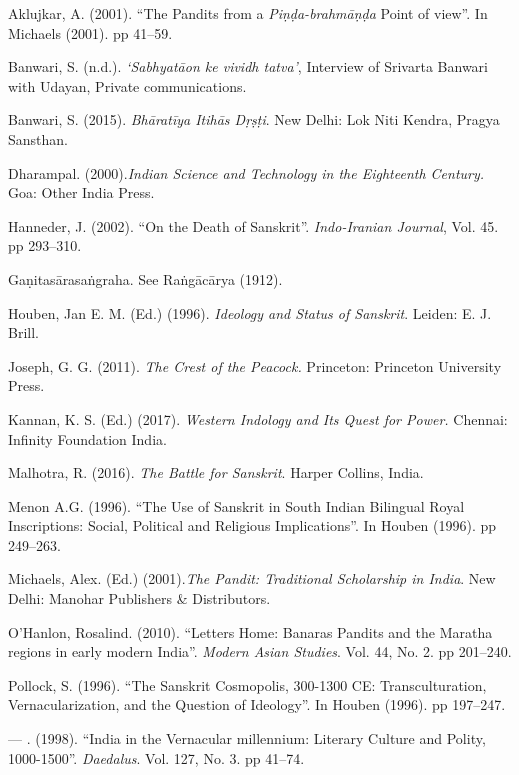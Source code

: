 \begin{thebibliography}{99}
\itemsep=1pt
 Aklujkar, A. (2001). “The Pandits from a \textit{Piṇḍa-brahmāṇḍa} Point of view”. In Michaels (2001). pp 41--59.

  Banwari, S. (n.d.). \textit{‘Sabhyatāon ke vividh tatva’}, Interview of Srivarta Banwari with Udayan, Private communications.

  Banwari, S. (2015). \textit{Bhāratīya Itihās Dṛṣṭi}. New Delhi: Lok Niti Kendra, Pragya Sansthan.

  Dharampal. (2000).\textit{Indian Science and Technology in the Eighteenth Century.} Goa: Other India Press.

  Hanneder, J. (2002). “On the Death of Sanskrit”. \textit{Indo-Iranian Journal}, Vol. 45. pp 293--310.
 
  Gaṇitasārasaṅgraha. See Raṅgācārya (1912).

  Houben, Jan E. M. (Ed.) (1996). \textit{Ideology and Status of Sanskrit}. Leiden: E. J. Brill.

  Joseph, G. G. (2011). \textit{The Crest of the Peacock.} Princeton: Princeton University Press.

  Kannan, K. S. (Ed.) (2017). \textit{Western Indology and Its Quest for Power.} Chennai: Infinity Foundation India.

  Malhotra, R. (2016). \textit{The Battle for Sanskrit}. Harper Collins, India.

  Menon A.G. (1996). “The Use of Sanskrit in South Indian Bilingual Royal Inscriptions: Social, Political and Religious Implications”. In Houben (1996). pp 249--263.

  Michaels, Alex. (Ed.) (2001).\textit{The Pandit: Traditional Scholarship in India}. New Delhi: Manohar Publishers \& Distributors.

  O’Hanlon, Rosalind. (2010). “Letters Home: Banaras Pandits and the Maratha regions in early modern India”. \textit{Modern Asian Studies}. Vol. 44, No. 2. pp 201--240.

  Pollock, S. (1996). “The Sanskrit Cosmopolis, 300-1300 CE: Transculturation, Vernacularization, and the Question of Ideology”. In Houben (1996). pp 197--247.

  — . (1998). “India in the Vernacular millennium: Literary Culture and Polity, 1000-1500”. \textit{Daedalus}. Vol. 127, No. 3. pp 41--74.


\end{thebibliography}
